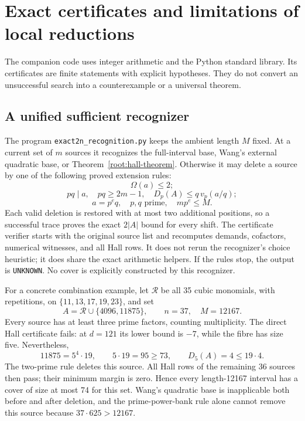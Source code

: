 \section{Exact certificates and limitations of local reductions}
\label{root:certificates}

The companion code uses integer arithmetic and the Python standard
library. Its certificates are finite statements with explicit
hypotheses. They do not convert an unsuccessful search into a
counterexample or a universal theorem.

\subsection{A unified sufficient recognizer}

The program \texttt{exact2n\_recognition.py} keeps the ambient
length \(M\) fixed. At a current set of \(m\) sources it recognizes
the full-interval base, Wang's external quadratic base, or
Theorem~\ref{root:hall-theorem}. Otherwise it may delete a source by
one of the following proved extension rules:
\[
 \Omega(a)\le2;
\]
\[
 pq\mid a,\quad pq\ge2m-1,\quad
 D_p(A)\le q\,v_p(a/q);
\]
\[
 a=p^e q,\quad p,q\text{ prime},\quad mp^e\le M.
\]
Each valid deletion is restored with at most two additional
positions, so a successful trace proves the exact \(2|A|\) bound
for every shift. The certificate verifier starts with the original
source list and recomputes demands, cofactors, numerical witnesses,
and all Hall rows. It does not rerun the recognizer's choice heuristic;
it does share the exact arithmetic helpers. If the rules stop, the
output is \texttt{UNKNOWN}. No cover is explicitly constructed by
this recognizer.

For a concrete combination example, let \(\mathcal R\) be all 35
cubic monomials, with repetitions, on
\(\{11,13,17,19,23\}\), and set
\[
 A=\mathcal R\cup\{4096,11875\},\qquad
 n=37,\quad M=12167.
\]
Every source has at least three prime factors, counting multiplicity.
The direct Hall certificate fails: at \(d=121\) its lower bound is
\(-7\), while the fibre has size five. Nevertheless,
\[
 11875=5^4\cdot19,\qquad
 5\cdot19=95\ge73,\qquad D_5(A)=4\le19\cdot4.
\]
The two-prime rule deletes this source. All Hall rows of the remaining
36 sources then pass; their minimum margin is zero. Hence every
length-12167 interval has a cover of size at most 74 for this set.
Wang's quadratic base is inapplicable both before and after deletion,
and the prime-power-bank rule alone cannot remove this source because
\(37\cdot625>12167\).

